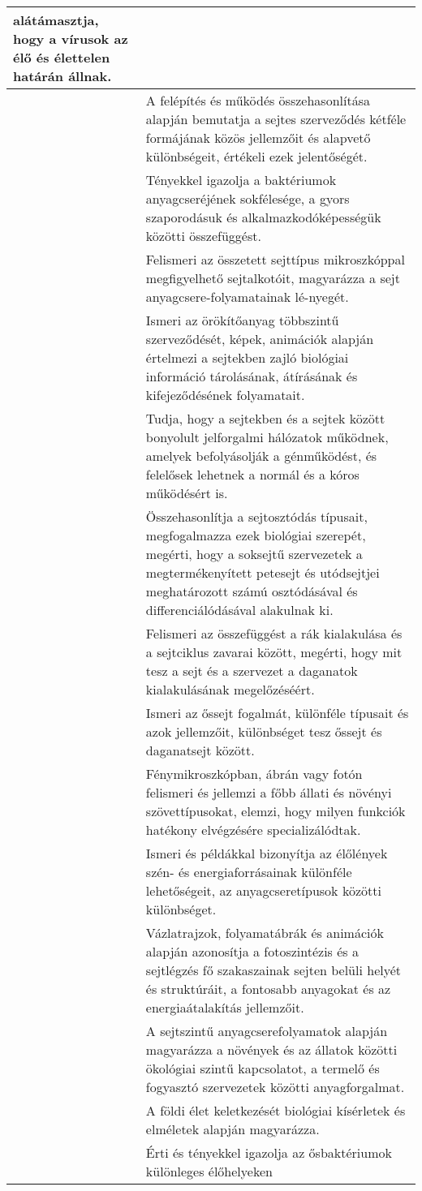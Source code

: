 \begin{longtable}[]{p{\evflength}@{\strut}>{\begin{minipage}{\columnlength}\strut}l<{\strut\end{minipage}}}
  alátámasztja, hogy a vírusok az élő és élettelen határán állnak.
\tabularnewline
\hline
&
  A felépítés és működés összehasonlítása alapján bemutatja a sejtes
  szerveződés kétféle formájának közös jellemzőit és alapvető
  különbségeit, értékeli ezek jelentőségét.
\tabularnewline
\hline
&
  Tényekkel igazolja a baktériumok anyagcseréjének sokfélesége, a gyors
  szaporodásuk és alkalmazkodóképességük közötti összefüggést.
\tabularnewline
\hline
&
  Felismeri az összetett sejttípus mikroszkóppal megfigyelhető
  sejtalkotóit, magyarázza a sejt anyagcsere-fo\-lya\-ma\-ta\-i\-nak
  lé-\break nyegét.
\tabularnewline
\hline
&
  Ismeri az örökítőanyag többszintű szerveződését, képek, animációk
  alapján értelmezi a sejtekben zajló biológiai információ tárolásának,
  átírásának és kifejeződésének folyamatait.
\tabularnewline
\hline
&
  Tudja, hogy a sejtekben és a sejtek között bonyolult jelforgalmi
  hálózatok működnek, amelyek befolyásolják a génműködést, és felelősek
  lehetnek a normál és a kóros működésért is.
\tabularnewline
\hline
&
  Összehasonlítja a sejtosztódás típusait, megfogalmazza ezek biológiai
  szerepét, megérti, hogy a soksejtű szervezetek a megtermékenyített
  petesejt és utódsejtjei meghatározott számú osztódásával és
  differenciálódásával alakulnak ki.
\tabularnewline
\hline
&
  Felismeri az összefüggést a rák kialakulása és a sejtciklus zavarai
  között, megérti, hogy mit tesz a sejt és a szervezet a daganatok
  kialakulásának megelőzéséért.
\tabularnewline
\hline
&
  Ismeri az őssejt fogalmát, különféle típusait és azok jellemzőit,
  különbséget tesz őssejt és daganatsejt között.
\tabularnewline
\hline
&
  Fénymikroszkópban, ábrán vagy fotón felismeri és jellemzi a főbb
  állati és növényi szövettípusokat, elemzi, hogy milyen funkciók
  hatékony elvégzésére specializálódtak.
\tabularnewline
\hline
&
  Ismeri és példákkal bizonyítja az élőlények szén- és
  energiaforrásainak különféle lehetőségeit, az anyagcseretípusok
  közötti különbséget.
\tabularnewline
\hline
&
  Vázlatrajzok, folyamatábrák és animációk alapján azonosítja a
  fotoszintézis és a sejtlégzés fő szakaszainak sejten belüli helyét és
  struktúráit, a fontosabb anyagokat és az energiaátalakítás jellemzőit.
\tabularnewline
\hline
&
  A sejtszintű anyagcserefolyamatok alapján magyarázza a növények és
  az állatok közötti ökológiai szintű kapcsolatot, a termelő és fogyasztó
  szervezetek közötti anyagforgalmat.
\tabularnewline
\hline
&
  A földi élet keletkezését biológiai kísérletek és elméletek alapján
  magyarázza.
\tabularnewline
\hline
&
  Érti és tényekkel igazolja az ősbaktériumok különleges élőhelyeken

\end{longtable}
